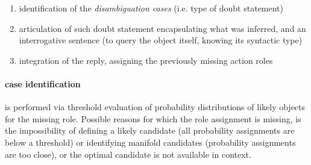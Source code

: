 \documentclass[oribibl]{llncs}
\begin{document}
\begin{enumerate} %
    \item identification of the \textit{disambiguation cases}  (i.e. type of doubt statement)\\
    \item articulation of such doubt statement encapsulating what was inferred, and an interrogative sentence (to query the object itself, knowing its syntactic type) \\ 
    \item integration of the reply, assigning the previously missing action roles 
\end{enumerate}

\paragraph{case identification} is performed via threshold evaluation of probability distributions of likely objects for the missing role. 
Possible reasons for which the role assignment is missing, is the impossibility of 
defining a likely candidate (all probability assignments are below a threshold) or identifying manifold candidates (probability assignments are too close), or
the optimal candidate is not available in context.  
\end{document}
